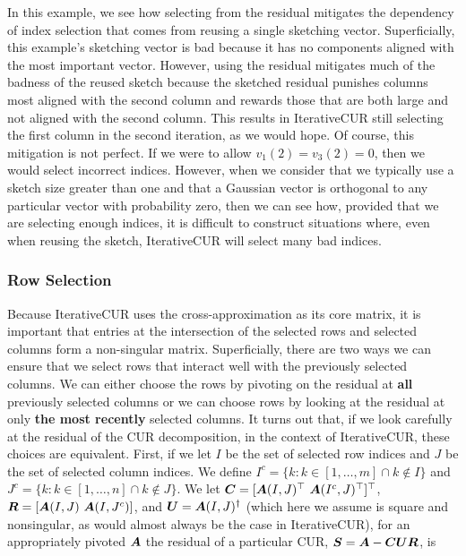 In this example, we see how selecting from the residual mitigates the dependency of index selection that comes from reusing a single sketching vector. Superficially, this example's sketching vector is bad because it has no components aligned with the most important vector. However, using the residual mitigates much of the badness of the reused sketch because the sketched residual punishes columns most aligned with the second column and rewards those that are both large and not aligned with the second column. This results in IterativeCUR still selecting the first column in the second iteration, as we would hope. Of course, this mitigation is not perfect. If we were to allow $v_1(2) = v_3(2) = 0$, then we would select incorrect indices. However, when we consider that we typically use a sketch size greater than one and that a Gaussian vector is orthogonal to any particular vector with probability zero, then we can see how, provided that we are selecting enough indices, it is difficult to construct situations where,  even when reusing the sketch, IterativeCUR will select many bad indices. 

 \subsubsection{Row Selection}
 Because IterativeCUR uses the cross-approximation as its core matrix, it is important that entries at the intersection of the selected rows and selected columns form a non-singular matrix. Superficially, there are two ways we can ensure that we select rows that interact well with the previously selected columns. We can either choose the rows by pivoting on the residual at \textbf{all} previously selected columns or we can choose rows by looking at the residual at only \textbf{the most recently} selected columns. It turns out that, if we look carefully at the residual of the CUR decomposition, in the context of IterativeCUR, these choices are equivalent. First, if we let $I$ be the set of selected row indices and $J$ be the set of selected column indices. We define $I^c = \{k: k \in [1, \dots, m] \cap k \not\in I\}$ and $J^c = \{k: k \in [1, \dots, n] \cap k \not\in J\}$. We let $\boldsymbol{C} = [\boldsymbol{A}(I, J)^\top\,\, \boldsymbol{A}(I^c,J)^\top]^\top$, $\boldsymbol{R} = [\boldsymbol{A}(I, J)\,\, \boldsymbol{A}(I,J^c)]$, and $\boldsymbol{U} = \boldsymbol{A}(I,J)^\dagger$
 (which here we assume is square and nonsingular, as would almost always be the case in IterativeCUR), for an appropriately pivoted $\boldsymbol{A}$ the residual of a particular CUR, $\boldsymbol{S} = \boldsymbol{A} - \boldsymbol{C} \boldsymbol{U} \boldsymbol{R}$, is

